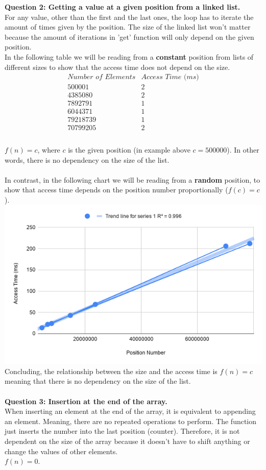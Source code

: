 \documentclass[11pt]{article}
\begin{document}
\textbf{Question 2: Getting a value at a given position from a linked list.}
\\For any value, other than the first and the last ones, the loop has to iterate the amount of times given by the position. The size of the linked list won't matter because the amount of iterations in 'get' function will only depend on the given position.
\\In the following table we will be reading from a \textbf{constant} position from lists of different sizes to show that the access time does not depend on the size.
\begin{displaymath}
\begin{array}{|c|c|}
\textit{Number of Elements} & \textit{Access Time (ms)}\\
\hline
 500001 & 2 \\
 4385080 & 2\\
 7892791 & 1\\
 6044371 & 1\\
 79218739 & 1\\
 70799205 & 2\\
\end{array}
\end{displaymath}
\\ $f(n) = c$, where $c$ is the given position (in example above $c=500000$). In other words, there is no dependency on the size of the list.\\
\\In contrast, in the following chart we will be reading from a \textbf{random} position, to show that access time depends on the position number proportionally ($f(c) = c$).\\
\includegraphics[width=\textwidth]{chart1.png}
\\Concluding, the relationship between the size and the access time is $f(n) = c$ meaning that there is no dependency on the size of the list.
\\
\\
\textbf{Question 3: Insertion at the end of the array.}
\\When inserting an element at the end of the array, it is equivalent to appending an element. Meaning, there are no repeated operations to perform. The function just inserts the number into the last position (counter). Therefore, it is not dependent on the size of the array because it doesn't have to shift anything or change the values of other elements.
\\$f(n) = 0$.
\end{document}
